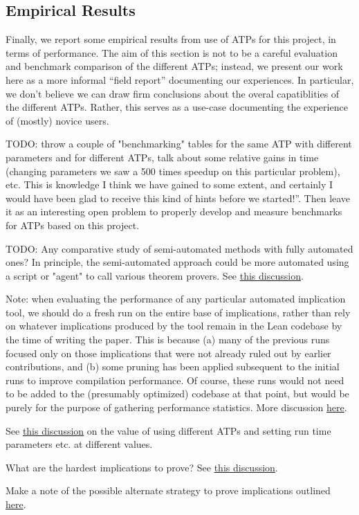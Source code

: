 \subsection{Empirical Results}

Finally, we report some empirical results from use of ATPs for this project, in terms of performance.
The aim of this section is not to be a careful evaluation and benchmark comparison of the different ATPs; instead, we present our work here as a more informal ``field report'' documenting our experiences.
In particular, we don't believe we can draw firm conclusions about the overal capatiblities of the different ATPs.
Rather, this serves as a use-case documenting the experience of (mostly) novice users.

TODO: throw a couple of "benchmarking" tables for the same ATP with different parameters and for different ATPs, talk about some relative gains in time (changing parameters we saw a 500 times speedup on this particular problem), etc. This is knowledge I think we have gained to some extent, and certainly I would have been glad to receive this kind of hints before we started!''.  Then leave it as an interesting open problem to properly develop and measure benchmarks for ATPs based on this project.

TODO: Any comparative study of semi-automated methods with fully automated ones? In principle, the semi-automated approach could be more automated using a script or "agent" to call various theorem provers. See \href{https://leanprover.zulipchat.com/#narrow/stream/458659-Equational/topic/A.20magma.20of.20order.20.3C.2013.20-.20for.20Equation2531.3F}{this discussion}.

Note: when evaluating the performance of any particular automated implication tool, we should do a fresh run on the entire base of implications, rather than rely on whatever implications produced by the tool remain in the Lean codebase by the time of writing the paper. This is because (a) many of the previous runs focused only on those implications that were not already ruled out by earlier contributions, and (b) some pruning has been applied subsequent to the initial runs to improve compilation performance. Of course, these runs would not need to be added to the (presumably optimized) codebase at that point, but would be purely for the purpose of gathering performance statistics. More discussion \href{https://leanprover.zulipchat.com/#narrow/stream/458659-Equational/topic/RECORDS.20REQUEST.3A.20data.20and.20performance.20automated.20run.20metrics}{here}.

See \href{https://leanprover.zulipchat.com/#narrow/channel/458659-Equational/topic/1516.20-.3E.20255/near/481547543}{this discussion} on the value of using different ATPs and setting run time parameters etc. at different values.

What are the hardest implications to prove?  See \href{https://leanprover.zulipchat.com/#narrow/channel/458659-Equational/topic/What.20are.20the.20hardest.20positive.20implications.20for.20an.20ATP.3F}{this discussion}.

Make a note of the possible alternate strategy to prove implications outlined \href{https://leanprover.zulipchat.com/#narrow/stream/458659-Equational/topic/Ideas.20for.20unknown.20implications}{here}.
